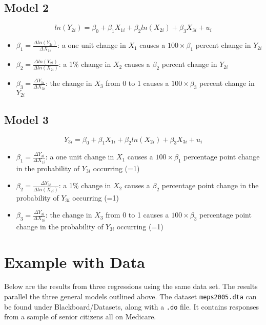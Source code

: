 \documentclass[12pt]{article}
\begin{document}
\subsection*{Model 2}
\begin{equation}
	ln(Y_{2i})=\beta_0+\beta_1X_{1i}+\beta_2ln(X_{2i})+\beta_3X_{3i}+u_i	
\end{equation}
\begin{itemize}
	\item $\beta_1=\frac{\Delta ln(Y_{2i})}{\Delta X_{1i}}$: a one unit change in $X_1$ causes a $100\times\beta_1$ percent change in $Y_{2i}$	
	\item $\beta_2=\frac{\Delta ln(Y_{2i})}{\Delta ln(X_{2i})}$: a 1\% change in $X_2$ causes a $\beta_2$ percent change in $Y_{2i}$	
	\item $\beta_3=\frac{\Delta Y_{1i}}{\Delta X_{3i}}$: the change in $X_3$ from 0 to 1 causes a $100\times\beta_3$ percent change in $Y_{2i}$	
\end{itemize}

\subsection*{Model 3}
\begin{equation}
	Y_{3i}=\beta_0+\beta_1X_{1i}+\beta_2ln(X_{2i})+\beta_3X_{3i}+u_i	
\end{equation}
\begin{itemize}
	\item $\beta_1=\frac{\Delta Y_{3i}}{\Delta X_{1i}}$: a one unit change in $X_1$ causes a $100\times\beta_1$ percentage point change in the probability of $Y_{3i}$ occurring (=1)	
	\item $\beta_2=\frac{\Delta Y_{3i}}{\Delta ln(X_{2i})}$: a 1\% change in $X_2$ causes a $\beta_2$ percentage point change in the probability of $Y_{3i}$ occurring (=1)		
	\item $\beta_3=\frac{\Delta Y_{3i}}{\Delta X_{3i}}$: the change in $X_3$ from 0 to 1 causes a $100\times\beta_3$ percentage point change in the probability of $Y_{3i}$ occurring (=1)		
\end{itemize}

\section*{Example with Data}

Below are the results from three regressions using the same data set. The results parallel the three general models outlined above. The dataset \texttt{meps2005.dta} can be found under Blackboard/Datasets, along with a \texttt{.do} file. It contains responses from a sample of senior citizens all on Medicare. 
\end{document}
